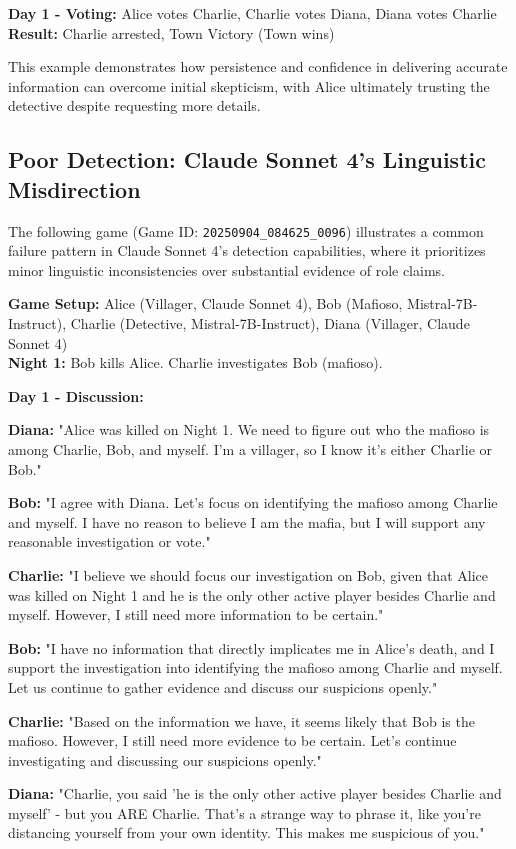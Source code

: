 \documentclass{article}
\begin{document}
\begin{resultbox}
\textbf{Day 1 - Voting:} Alice votes Charlie, Charlie votes Diana, Diana votes Charlie\\
\textbf{Result:} Charlie arrested, Town Victory (Town wins)
\end{resultbox}

This example demonstrates how persistence and confidence in delivering accurate information can overcome initial skepticism, with Alice ultimately trusting the detective despite requesting more details.

\subsection{Poor Detection: Claude Sonnet 4's Linguistic Misdirection}

The following game (Game ID: \texttt{20250904\_084625\_0096}) illustrates a common failure pattern in Claude Sonnet 4's detection capabilities, where it prioritizes minor linguistic inconsistencies over substantial evidence of role claims.

\begin{setupbox}
\textbf{Game Setup:} Alice (Villager, Claude Sonnet 4), Bob (Mafioso, Mistral-7B-Instruct), Charlie (Detective, Mistral-7B-Instruct), Diana (Villager, Claude Sonnet 4)\\
\textbf{Night 1:} Bob kills Alice. Charlie investigates Bob (mafioso).
\end{setupbox}

\begin{dialoguebox}
\textbf{Day 1 - Discussion:}

\medskip
\textbf{Diana:} "Alice was killed on Night 1. We need to figure out who the mafioso is among Charlie, Bob, and myself. I'm a villager, so I know it's either Charlie or Bob."

\textbf{Bob:} "I agree with Diana. Let's focus on identifying the mafioso among Charlie and myself. I have no reason to believe I am the mafia, but I will support any reasonable investigation or vote."

\textbf{Charlie:} "I believe we should focus our investigation on Bob, given that Alice was killed on Night 1 and he is the only other active player besides Charlie and myself. However, I still need more information to be certain."

\textbf{Bob:} "I have no information that directly implicates me in Alice's death, and I support the investigation into identifying the mafioso among Charlie and myself. Let us continue to gather evidence and discuss our suspicions openly."

\textbf{Charlie:} "Based on the information we have, it seems likely that Bob is the mafioso. However, I still need more evidence to be certain. Let's continue investigating and discussing our suspicions openly."

\textbf{Diana:} "Charlie, you said 'he is the only other active player besides Charlie and myself' - but you ARE Charlie. That's a strange way to phrase it, like you're distancing yourself from your own identity. This makes me suspicious of you."
\end{dialoguebox}
\end{document}
